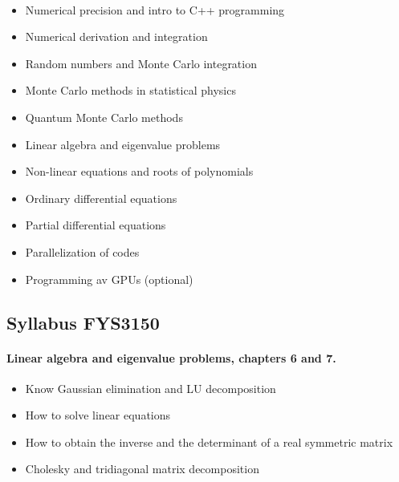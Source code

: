 \documentclass[%
oneside,                 %
final,                   %
10pt]{article}
\begin{document}
\paragraph{}
\begin{itemize}
  \item Numerical precision and intro to C++ programming

  \item Numerical derivation and integration

  \item Random numbers and Monte Carlo integration

  \item Monte Carlo methods in statistical physics

  \item Quantum Monte Carlo methods

  \item Linear algebra and eigenvalue problems

  \item Non-linear equations and roots of polynomials

  \item Ordinary differential equations

  \item Partial differential equations

  \item Parallelization of codes

  \item Programming av GPUs (optional)
\end{itemize}

\noindent




\subsection*{Syllabus FYS3150}


\paragraph{Linear algebra and eigenvalue problems, chapters 6 and 7.}
\begin{itemize}
  \item Know Gaussian elimination and LU decomposition

  \item How to solve linear equations

  \item How to obtain the inverse and the determinant of a real symmetric matrix

  \item Cholesky and tridiagonal matrix decomposition
\end{itemize}
\end{document}
